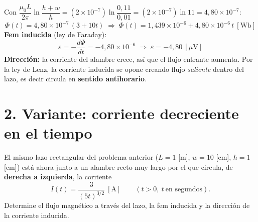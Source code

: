 \documentclass[12pt,letterpaper]{article}
\newcommand{\eps}{\varepsilon}
\begin{document}
\medskip

\noindent Con $\dfrac{\mu_0 L}{2\pi}\ln\dfrac{h+w}{h}
= (2\times10^{-7})\ln\!\dfrac{0{,}11}{0{,}01} = (2\times10^{-7})\ln 11 = 4{,}80\times10^{-7}$:
\[
    \Phi(t) = 4{,}80\times10^{-7}\,(3+10t)
    \;\Rightarrow\;
    \boxed{\Phi(t) = 1{,}439\times10^{-6} + 4{,}80\times10^{-6}\,t\ [\text{Wb}]}
\]
\textbf{Fem inducida} (ley de Faraday):
\[
    \eps = -\frac{d\Phi}{dt} = -4{,}80\times10^{-6}
    \;\Rightarrow\;
    \boxed{\eps = -4{,}80\ [\mu\text{V}]}
\]
\textbf{Direcci\'on:} la corriente del alambre crece, as\'i que el flujo entrante aumenta. Por la
ley de Lenz, la corriente inducida se opone creando flujo \emph{saliente} dentro del lazo, es decir
circula en \textbf{sentido antihorario}.

\newpage

\section*{2. Variante: corriente decreciente en el tiempo}

\noindent El mismo lazo rectangular del problema anterior ($L = 1$ [m], $w = 10$ [cm],
$h = 1$ [cm]) est\'a ahora junto a un alambre recto muy largo por el que circula, de
\textbf{derecha a izquierda}, la corriente
\[
    I(t) = \frac{3}{(5t)^{3/2}}\ [\text{A}] \qquad (t>0,\ t\ \text{en segundos}).
\]
Determine el flujo magn\'etico a trav\'es del lazo, la fem inducida y la direcci\'on de la
corriente inducida.
\end{document}

